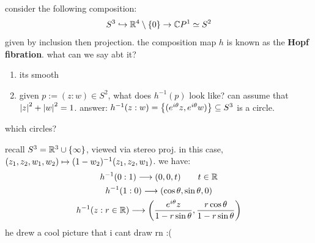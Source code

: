 consider the following composition:
\begin{equation*}
    S^{3}\hookrightarrow\mathbb{R}^{4}\setminus\left\{{0}\right\}\rightarrow\mathbb{C} P^{1}\simeq S^{2}
\end{equation*}
given by inclusion then projection.
the composition map $h$ is known as the \textbf{Hopf fibration}.
what can we say abt it?
\begin{enumerate}[(1)]
	\item its smooth
	\item given $p:=(z:w)\in S^{2}$, what does $h^{-1}(p)$ look like?
		can assume that $\abs{z}^{2}+\abs{w}^{2}=1$. answer:
		$h^{-1}(z:w)=\left\{{(e^{i\theta}z,e^{i\theta}w)}\right\}\subseteq S^{3}$ is a circle.
\end{enumerate}
which circles?

recall $S^{3}=\mathbb{R}^{3}\cup\left\{{\infty}\right\}$, viewed via stereo proj.
in this case, $(z_{1},z_{2},w_{1},w_{2})\mapsto(1-w_{2})^{-1}(z_{1},z_{2},w_{1})$.
we have:
\begin{gather*}
    h^{-1}(0:1)\longrightarrow(0,0,t) \qquad t\in\mathbb{R} \\
	h^{-1}(1:0)\longrightarrow(\cos\theta,\sin\theta,0) \\
	h^{-1}(z:r\in\mathbb{R})\longrightarrow
	\left(\frac{e^{i\theta}z}{1-r\sin\theta},\frac{r\cos\theta}{1-r\sin\theta}\right)
\end{gather*}
he drew a cool picture that i cant draw rn :(



